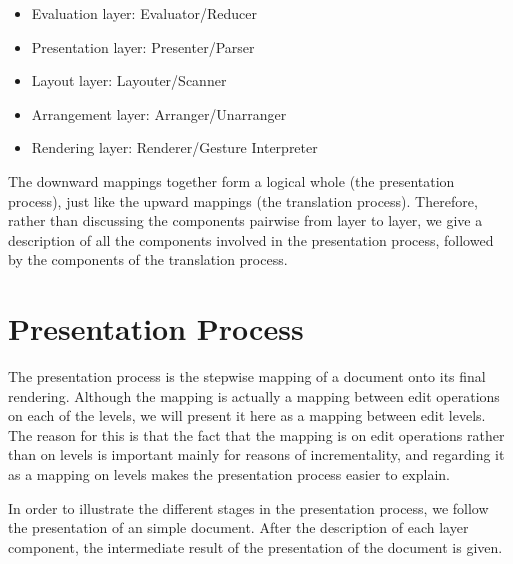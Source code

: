 \begin{itemize}
\item Evaluation layer: Evaluator/Reducer

\item Presentation layer: Presenter/Parser
\item Layout layer: Layouter/Scanner
\item Arrangement layer: Arranger/Unarranger
\item Rendering layer: Renderer/Gesture Interpreter
\end{itemize}

The downward mappings together form a logical whole (the presentation process), just like the upward mappings (the translation process). Therefore, rather than discussing the components pairwise from layer to layer, we give a description of all the components involved in the presentation process, followed by the components of the translation process.

\section{Presentation Process}
\label{sect:presprocess}
The presentation process is the stepwise mapping of a document onto its final rendering. Although the mapping is actually a mapping between edit operations on each of the levels, we will present it here as a mapping between edit levels. The reason for this is that the fact that the mapping is on edit operations rather than on levels is important mainly for reasons of incrementality, and regarding it as a mapping on levels makes the presentation process easier to explain.

In order to illustrate the different stages in the presentation process, we follow the presentation of an simple document. After the description of each layer component, the intermediate result of the presentation of the document is given.


